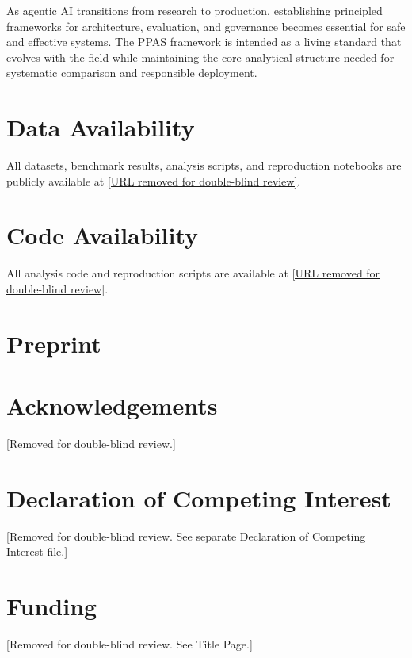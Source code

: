\documentclass[review]{elsarticle}
\theoremstyle{definition}
\begin{document}
As agentic AI transitions from research to production, establishing principled frameworks for architecture, evaluation, and governance becomes essential for safe and effective systems. The PPAS framework is intended as a living standard that evolves with the field while maintaining the core analytical structure needed for systematic comparison and responsible deployment.


\section*{Data Availability}

All datasets, benchmark results, analysis scripts, and reproduction notebooks are publicly available at \url{[URL removed for double-blind review]}.

\section*{Code Availability}

All analysis code and reproduction scripts are available at \url{[URL removed for double-blind review]}.

\section*{Preprint}


\section*{Acknowledgements}

[Removed for double-blind review.]

\section*{Declaration of Competing Interest}

[Removed for double-blind review. See separate Declaration of Competing Interest file.]

\section*{Funding}

[Removed for double-blind review. See Title Page.]



\end{document}
